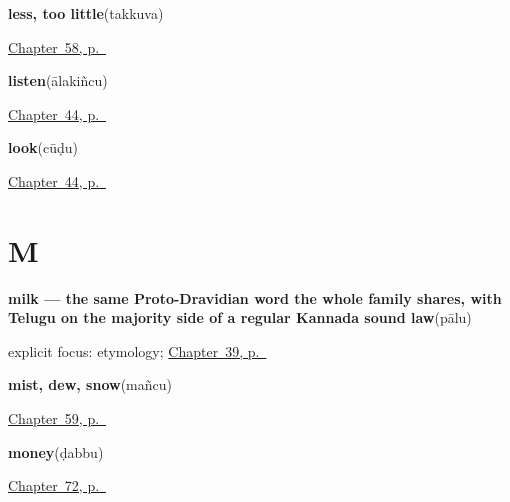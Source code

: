 \noindent\begin{minipage}[t]{\linewidth}
\raggedright
\textbf{less, too little}\enspace\emph{}\enspace(takkuva)\par
\footnotesize \hyperref[ch:te-more-replies]{Chapter~58, p.~\pageref*{ch:te-more-replies}}
\end{minipage}\par\smallskip

\noindent\begin{minipage}[t]{\linewidth}
\raggedright
\textbf{listen}\enspace\emph{}\enspace(ālakiñcu)\par
\footnotesize \hyperref[ch:te-see-say]{Chapter~44, p.~\pageref*{ch:te-see-say}}
\end{minipage}\par\smallskip

\noindent\begin{minipage}[t]{\linewidth}
\raggedright
\textbf{look}\enspace\emph{}\enspace(cūḍu)\par
\footnotesize \hyperref[ch:te-see-say]{Chapter~44, p.~\pageref*{ch:te-see-say}}
\end{minipage}\par\smallskip

\section*{M}

\noindent\begin{minipage}[t]{\linewidth}
\raggedright
\textbf{milk — the same Proto-Dravidian word the whole family shares, with Telugu on the majority side of a regular Kannada sound law}\enspace\emph{}\enspace(pālu)\par
\footnotesize explicit focus: etymology; \hyperref[ch:te-tea-and-milk]{Chapter~39, p.~\pageref*{ch:te-tea-and-milk}}
\end{minipage}\par\smallskip

\noindent\begin{minipage}[t]{\linewidth}
\raggedright
\textbf{mist, dew, snow}\enspace\emph{}\enspace(mañcu)\par
\footnotesize \hyperref[ch:te-weather-ground]{Chapter~59, p.~\pageref*{ch:te-weather-ground}}
\end{minipage}\par\smallskip

\noindent\begin{minipage}[t]{\linewidth}
\raggedright
\textbf{money}\enspace\emph{}\enspace(ḍabbu)\par
\footnotesize \hyperref[ch:te-the-market]{Chapter~72, p.~\pageref*{ch:te-the-market}}
\end{minipage}\par\smallskip

